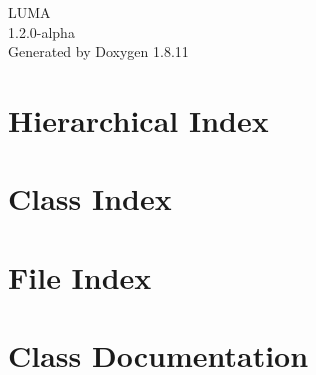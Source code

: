 \documentclass[twoside]{book}
\newcommand{\+}{\discretionary{\mbox{\scriptsize$\hookleftarrow$}}{}{}}
\newcommand{\clearemptydoublepage}{%
  \newpage{\pagestyle{empty}\cleardoublepage}%
}
\begin{document}
\hypersetup{pageanchor=false,
             bookmarksnumbered=true,
             pdfencoding=unicode
            }
\begin{titlepage}
\vspace*{7cm}
\begin{center}%
{\Large L\+U\+MA \\[1ex]\large 1.\+2.\+0-\/alpha }\\
\vspace*{1cm}
{\large Generated by Doxygen 1.8.11}\\
\end{center}
\end{titlepage}
\clearemptydoublepage
\tableofcontents
\clearemptydoublepage
{}
\hypersetup{pageanchor=true}

\chapter{Hierarchical Index}

\chapter{Class Index}

\chapter{File Index}

\chapter{Class Documentation}
















\end{document}
